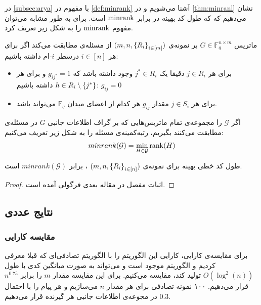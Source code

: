 در
\autoref{subsec:arya}
با مفهوم
در
\autoref{def:minrank}
آشنا می‌شویم و در
\autoref{thm:minranl}
نشان می‌دهیم که که طول کد بهینه در
\icod
برابر
$\mathrm{minrank}$
است. برای
\picod
به طور مشابه می‌توان مفهوم
$\mathrm{minrank}$
را به شکل زیر تعریف کرد.
\begin{definition}
    ماتریس
    $G \in \mathbb{F}^{n\times m}_q$
    بر نمونه‌ی
    $(m, n, \left\{ R_i \right\}_{i \in [m]})$
    از مسئله‌ی
    \picod
    مطابقت می‌کند اگر برای هر
    $i \in [n]$
    درسطر
    $i$-ام داشته باشیم:
    \begin{itemize}
        \item
        برای هر
        $j \in R_i$
        دقیقا یک
        $j^\ast \in R_i$
        وجود داشته باشد که
        $g_{i j^\ast}= 1$
        و برای هر
        $h \in R_i \setminus \left\{ j^\ast \right\}$
        داشته باشیم:
        $g_{i j} = 0$
        \item
        برای هر
        $j \in S_i$
        مقدار
        $g_{i j}$
        هر کدام از اعضای میدان
        $\mathbb{F}_q$
        می‌تواند باشد.
    \end{itemize}
\end{definition}
\begin{definition}
    اگر
    $\mathcal{G}$
    را مجموعه‌ی تمام ماتریس‌هایی که بر گراف اطلاعات جانبی    $G$ در مسئله‌ی
    \picod
    مطابقت می‌کنند بگیریم، رتبه‌کمینه‌ی مسئله را به شکل زیر تعریف می‌کنیم:
    $$minrank(\mathcal{G}) = \min_{H \in \mathcal{G}} \operatorname{rank}(H)$$

\end{definition}
\begin{theorem}
    \label{theorem:pliable2016:theorem3}
    طول کد خطی بهینه برای نمونه‌ی
    $(m, n, \left\{ R_i \right\}_{i \in [n]})$
    ،
    \picod
    برابر
    $minrank(\mathcal{G})$
    است.
\end{theorem}
\begin{proof}
    اثبات مفصل در مقاله بعدی فرگولی
    \cite{song2016deterministic}
    آمده است.
\end{proof}

\subsection{
    نتایج عددی
}
\subsubsection{
    مقایسه کارایی
}
برای مقایسه‌ی کارایی، کارایی این الگوریتم را با الگوریتم تصادفی‌ای که قبلا معرفی کردیم و  الگوریتم موجود است و می‌تواند به صورت میانگین کدی با طول
$O(\log^2(n))$
تولید کند، مقایسه می‌کنیم. برای این مقایسه مقدار
$m$
را برابر
$n^{0.75}$
قرار می‌دهیم. ۱۰۰ نمونه تصادفی برای هر مقدار
$n$
می‌سازیم و هر پیام را با احتمال
$0.3$
در مجوعه‌ی اطلاعات جانبی هر گیرنده قرار می‌دهیم.

